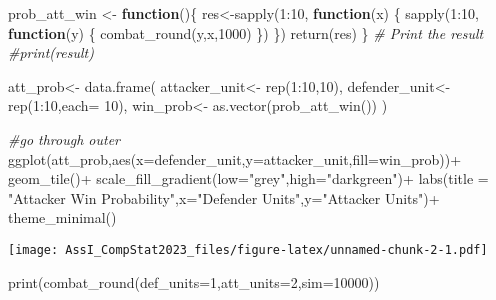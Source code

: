 \documentclass[
]{article}
\newenvironment{Shaded}{\begin{snugshade}}{\end{snugshade}}
\newcommand{\AttributeTok}[1]{\textcolor[rgb]{0.77,0.63,0.00}{#1}}
\newcommand{\CommentTok}[1]{\textcolor[rgb]{0.56,0.35,0.01}{\textit{#1}}}
\newcommand{\ControlFlowTok}[1]{\textcolor[rgb]{0.13,0.29,0.53}{\textbf{#1}}}
\newcommand{\DecValTok}[1]{\textcolor[rgb]{0.00,0.00,0.81}{#1}}
\newcommand{\FunctionTok}[1]{\textcolor[rgb]{0.00,0.00,0.00}{#1}}
\newcommand{\NormalTok}[1]{#1}
\newcommand{\OtherTok}[1]{\textcolor[rgb]{0.56,0.35,0.01}{#1}}
\newcommand{\SpecialCharTok}[1]{\textcolor[rgb]{0.00,0.00,0.00}{#1}}
\newcommand{\StringTok}[1]{\textcolor[rgb]{0.31,0.60,0.02}{#1}}
\begin{document}
\begin{Shaded}
\begin{Highlighting}[]
\NormalTok{prob\_att\_win }\OtherTok{\textless{}{-}} \ControlFlowTok{function}\NormalTok{()\{}
\NormalTok{  res}\OtherTok{\textless{}{-}}\FunctionTok{sapply}\NormalTok{(}\DecValTok{1}\SpecialCharTok{:}\DecValTok{10}\NormalTok{, }\ControlFlowTok{function}\NormalTok{(x) \{}
  \FunctionTok{sapply}\NormalTok{(}\DecValTok{1}\SpecialCharTok{:}\DecValTok{10}\NormalTok{, }\ControlFlowTok{function}\NormalTok{(y) \{}
    \FunctionTok{combat\_round}\NormalTok{(y,x,}\DecValTok{1000}\NormalTok{)}
\NormalTok{    \})}
\NormalTok{  \})}
  \FunctionTok{return}\NormalTok{(res)}
\NormalTok{\}}
\CommentTok{\# Print the result}
\CommentTok{\#print(result)}


\NormalTok{att\_prob}\OtherTok{\textless{}{-}} \FunctionTok{data.frame}\NormalTok{(}
\NormalTok{  attacker\_unit}\OtherTok{\textless{}{-}} \FunctionTok{rep}\NormalTok{(}\DecValTok{1}\SpecialCharTok{:}\DecValTok{10}\NormalTok{,}\DecValTok{10}\NormalTok{),}
\NormalTok{  defender\_unit}\OtherTok{\textless{}{-}} \FunctionTok{rep}\NormalTok{(}\DecValTok{1}\SpecialCharTok{:}\DecValTok{10}\NormalTok{,}\AttributeTok{each=} \DecValTok{10}\NormalTok{),}
\NormalTok{  win\_prob}\OtherTok{\textless{}{-}} \FunctionTok{as.vector}\NormalTok{(}\FunctionTok{prob\_att\_win}\NormalTok{())}
\NormalTok{)}


\CommentTok{\#go through outer }
\FunctionTok{ggplot}\NormalTok{(att\_prob,}\FunctionTok{aes}\NormalTok{(}\AttributeTok{x=}\NormalTok{defender\_unit,}\AttributeTok{y=}\NormalTok{attacker\_unit,}\AttributeTok{fill=}\NormalTok{win\_prob))}\SpecialCharTok{+}
  \FunctionTok{geom\_tile}\NormalTok{()}\SpecialCharTok{+}
  \FunctionTok{scale\_fill\_gradient}\NormalTok{(}\AttributeTok{low=}\StringTok{"grey"}\NormalTok{,}\AttributeTok{high=}\StringTok{"darkgreen"}\NormalTok{)}\SpecialCharTok{+}
  \FunctionTok{labs}\NormalTok{(}\AttributeTok{title =} \StringTok{"Attacker Win Probability"}\NormalTok{,}\AttributeTok{x=}\StringTok{"Defender Units"}\NormalTok{,}\AttributeTok{y=}\StringTok{"Attacker Units"}\NormalTok{)}\SpecialCharTok{+}
  \FunctionTok{theme\_minimal}\NormalTok{()}
\end{Highlighting}
\end{Shaded}

\texttt{[image: AssI\_CompStat2023\_files/figure-latex/unnamed-chunk-2-1.pdf]}

\begin{Shaded}
\begin{Highlighting}[]
\FunctionTok{print}\NormalTok{(}\FunctionTok{combat\_round}\NormalTok{(}\AttributeTok{def\_units=}\DecValTok{1}\NormalTok{,}\AttributeTok{att\_units=}\DecValTok{2}\NormalTok{,}\AttributeTok{sim=}\DecValTok{10000}\NormalTok{))}
\end{Highlighting}
\end{Shaded}
\end{document}
